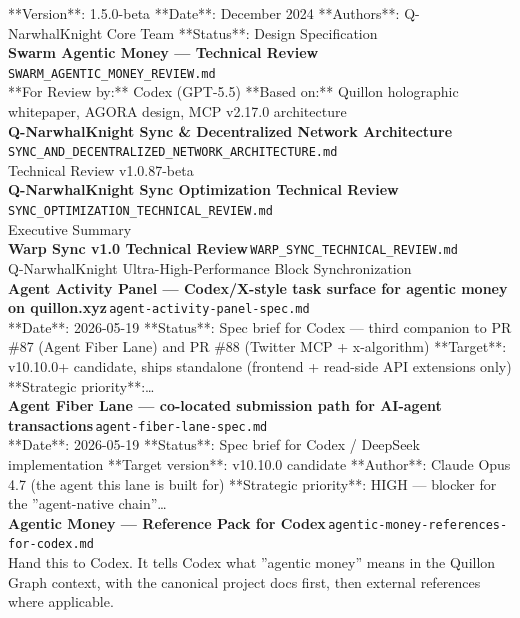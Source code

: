 \documentclass[11pt,a4paper]{article}
\begin{document}
**Version**: 1.5.0-beta **Date**: December 2024 **Authors**: Q-NarwhalKnight Core Team **Status**: Design Specification\\[6pt]
\noindent\textbf{Swarm Agentic Money --- Technical Review}\,\textcolor{qgray}{\small \texttt{SWARM\_AGENTIC\_MONEY\_REVIEW.md}}\\
**For Review by:** Codex (GPT-5.5) **Based on:** Quillon holographic whitepaper, AGORA design, MCP v2.17.0 architecture\\[6pt]
\noindent\textbf{Q-NarwhalKnight Sync \& Decentralized Network Architecture}\,\textcolor{qgray}{\small \texttt{SYNC\_AND\_DECENTRALIZED\_NETWORK\_ARCHITECTURE.md}}\\
Technical Review v1.0.87-beta\\[6pt]
\noindent\textbf{Q-NarwhalKnight Sync Optimization Technical Review}\,\textcolor{qgray}{\small \texttt{SYNC\_OPTIMIZATION\_TECHNICAL\_REVIEW.md}}\\
Executive Summary\\[6pt]
\noindent\textbf{Warp Sync v1.0 Technical Review}\,\textcolor{qgray}{\small \texttt{WARP\_SYNC\_TECHNICAL\_REVIEW.md}}\\
Q-NarwhalKnight Ultra-High-Performance Block Synchronization\\[6pt]
\noindent\textbf{Agent Activity Panel --- Codex/X-style task surface for agentic money on quillon.xyz}\,\textcolor{qgray}{\small \texttt{agent-activity-panel-spec.md}}\\
**Date**: 2026-05-19 **Status**: Spec brief for Codex --- third companion to PR \#87 (Agent Fiber Lane) and PR \#88 (Twitter MCP + x-algorithm) **Target**: v10.10.0+ candidate, ships standalone (frontend + read-side API extensions only) **Strategic priority**:\ldots{}\\[6pt]
\noindent\textbf{Agent Fiber Lane --- co-located submission path for AI-agent transactions}\,\textcolor{qgray}{\small \texttt{agent-fiber-lane-spec.md}}\\
**Date**: 2026-05-19 **Status**: Spec brief for Codex / DeepSeek implementation **Target version**: v10.10.0 candidate **Author**: Claude Opus 4.7 (the agent this lane is built for) **Strategic priority**: HIGH --- blocker for the ''agent-native chain''\ldots{}\\[6pt]
\noindent\textbf{Agentic Money --- Reference Pack for Codex}\,\textcolor{qgray}{\small \texttt{agentic-money-references-for-codex.md}}\\
Hand this to Codex. It tells Codex what ''agentic money'' means in the Quillon Graph context, with the canonical project docs first, then external references where applicable.\\[6pt]
\end{document}

